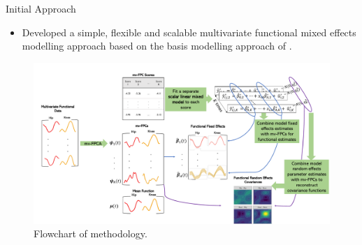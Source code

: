 \documentclass[aspectratio=128,xcolor=dvipsnames, notes]{beamer}
\newcommand{\1}{\mathbf{1}}
\begin{document}
\begin{frame}{Initial Approach \parencite{gunning_analyzing_2023}}
\begin{itemize}
    \pause \item Developed a simple, flexible and scalable multivariate functional mixed effects modelling approach based on the basis modelling approach of \textcite{morris_wavelet-based_2006}.
\end{itemize}
\pause \begin{figure}
    \centering
    \includegraphics[width=0.75\linewidth]{figures/flowchart.pdf}
    \caption{Flowchart of methodology.}
    \label{fig:enter-label}
\end{figure}
\end{frame}
\end{document}
